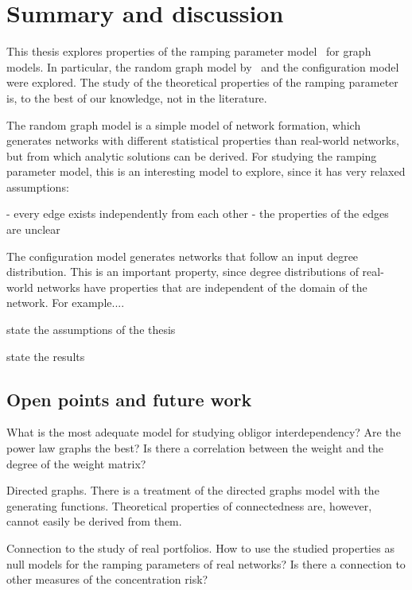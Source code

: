 \chapter{Summary and discussion} %
\label{cha:discussion}

This thesis explores properties of the ramping parameter model~\cite{Sindel:2009} for graph models.
In particular, the random graph model by~\cite{} and the configuration model were explored.
The study of the theoretical properties of the ramping parameter is, to the best of our knowledge, not in the literature.


The random graph model is a simple model of network formation, which generates networks with different statistical properties than real-world networks, but from which analytic solutions can be derived.
For studying the ramping parameter model, this is an interesting model to explore, since it has very relaxed assumptions:
\begin{itemize}
- every edge exists independently from each other
- the properties of the edges are unclear
\end{itemize}

The configuration model generates networks that follow an input degree distribution.
This is an important property, since degree distributions of real-world networks have properties that are independent of the domain of the network.
For example....



state the assumptions of the thesis

state the results


\section{Open points and future work}
\label{sec:open_points}

What is the most adequate model for studying obligor interdependency?
Are the power law graphs the best?
Is there a correlation between the weight and the degree of the weight matrix?


Directed graphs.
There is a treatment of the directed graphs model with the generating functions.
Theoretical properties of connectedness are, however, cannot easily be derived from them.



Connection to the study of real portfolios.
How to use the studied properties as null models for the ramping parameters of real networks?
Is there a connection to other measures of the concentration risk?




